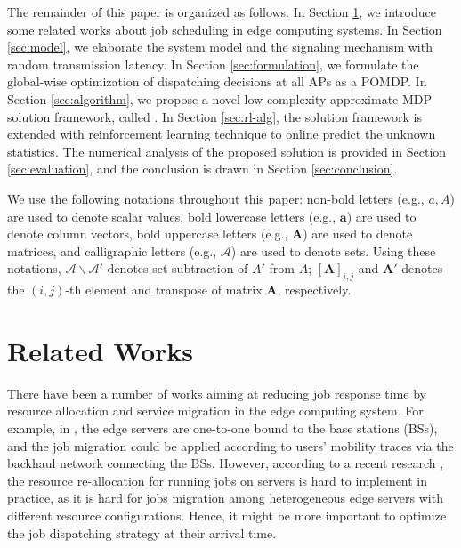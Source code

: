 The remainder of this paper is organized as follows.
In Section \ref{sec:review}, we introduce some related works about job scheduling in edge computing systems.
In Section \ref{sec:model}, we elaborate the system model and the signaling mechanism with random transmission latency.
In Section \ref{sec:formulation}, we formulate the global-wise optimization of dispatching decisions at all APs as a POMDP.
In Section \ref{sec:algorithm}, we propose a novel low-complexity approximate MDP solution framework, called \algname.
In Section \ref{sec:rl-alg}, the solution framework is extended with reinforcement learning technique to online predict the unknown statistics.
The numerical analysis of the proposed solution is provided in Section \ref{sec:evaluation}, and the conclusion is drawn in Section \ref{sec:conclusion}.

We use the following notations throughout this paper: 
non-bold letters (e.g., $a, A$) are used to denote scalar values,
bold lowercase letters (e.g., $\mathbf{a}$) are used to denote column vectors,
bold uppercase letters (e.g., $\mathbf{A}$) are used to denote matrices,
and calligraphic letters (e.g., $\mathcal{A}$) are used to denote sets.
Using these notations, $\mathcal{A}\backslash\mathcal{A'}$ denotes set subtraction of $A'$ from $A$; $[\mathbf{A}]_{i,j}$ and $\mathbf{A}'$ denotes the $(i,j)$-th element and transpose of matrix $\mathbf{A}$, respectively.

\section{Related Works}
\label{sec:review}
There have been a number of works aiming at reducing job response time by resource allocation and service migration in the edge computing system.
For example, in \cite{TON19-WangSq}, the edge servers are one-to-one bound to the base stations (BSs), and the job migration could be applied according to users' mobility traces via the backhaul network connecting the BSs.
However, according to a recent research \cite{INFOCOM19-WuC}, the resource re-allocation for running jobs on servers is hard to implement in practice, as it is hard for jobs migration among heterogeneous edge servers with different resource configurations.
Hence, it might be more important to optimize the job dispatching strategy at their arrival time.

